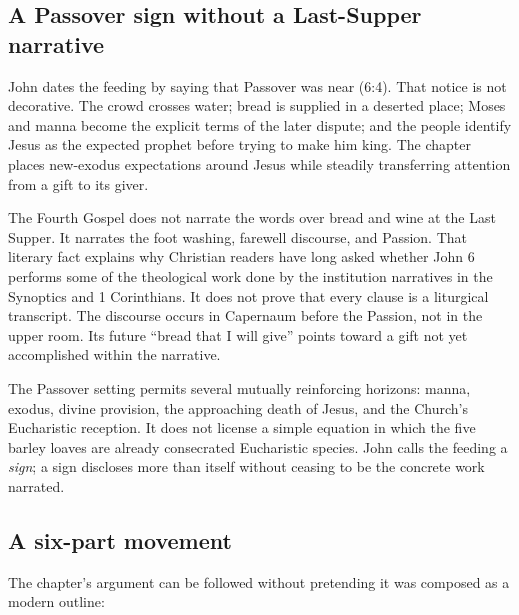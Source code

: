 \begin{deepstudy}
\subsection{A Passover sign without a Last-Supper narrative}

John dates the feeding by saying that Passover was near (6:4). That notice is
not decorative. The crowd crosses water; bread is supplied in a deserted place;
Moses and manna become the explicit terms of the later dispute; and the people
identify Jesus as the expected prophet before trying to make him king. The
chapter places new-exodus expectations around Jesus while steadily transferring
attention from a gift to its giver.

The Fourth Gospel does not narrate the words over bread and wine at the Last
Supper. It narrates the foot washing, farewell discourse, and Passion. That
literary fact explains why Christian readers have long asked whether John 6
performs some of the theological work done by the institution narratives in
the Synoptics and 1 Corinthians. It does not prove that every clause is a
liturgical transcript. The discourse occurs in Capernaum before the Passion,
not in the upper room. Its future ``bread that I will give'' points toward a
gift not yet accomplished within the narrative.

The Passover setting permits several mutually reinforcing horizons: manna,
exodus, divine provision, the approaching death of Jesus, and the Church's
Eucharistic reception. It does not license a simple equation in which the five
barley loaves are already consecrated Eucharistic species. John calls the
feeding a \emph{sign}; a sign discloses more than itself without ceasing to be
the concrete work narrated.

\subsection{A six-part movement}

The chapter's argument can be followed without pretending it was composed as a
modern outline:


\end{deepstudy}
